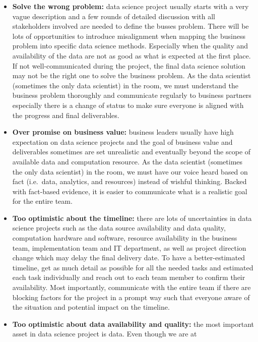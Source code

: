 \documentclass[
]{article}
\begin{document}
\begin{itemize}
\item
  \textbf{Solve the wrong problem:} data science project usually starts
  with a very vague description and a few rounds of detailed discussion
  with all stakeholders involved are needed to define the busses
  problem. There will be lots of opportunities to introduce misalignment
  when mapping the business problem into specific data science methods.
  Especially when the quality and availability of the data are not as
  good as what is expected at the first place. If not well-communicated
  during the project, the final data science solution may not be the
  right one to solve the business problem. As the data scientist
  (sometimes the only data scientist) in the room, we must understand
  the business problem thoroughly and communicate regularly to business
  partners especially there is a change of status to make sure everyone
  is aligned with the progress and final deliverables.
\item
  \textbf{Over promise on business value:} business leaders usually have
  high expectation on data science projects and the goal of business
  value and deliverables sometimes are set unrealistic and eventually
  beyond the scope of available data and computation resource. As the
  data scientist (sometimes the only data scientist) in the room, we
  must have our voice heard based on fact (i.e.~data, analytics, and
  resources) instead of wishful thinking. Backed with fact-based
  evidence, it is easier to communicate what is a realistic goal for the
  entire team.
\item
  \textbf{Too optimistic about the timeline:} there are lots of
  uncertainties in data science projects such as the data source
  availability and data quality, computation hardware and software,
  resource availability in the business team, implementation team and IT
  department, as well as project direction change which may delay the
  final delivery date. To have a better-estimated timeline, get as much
  detail as possible for all the needed tasks and estimated each task
  individually and reach out to each team member to confirm their
  availability. Most importantly, communicate with the entire team if
  there are blocking factors for the project in a prompt way such that
  everyone aware of the situation and potential impact on the timeline.
\item
  \textbf{Too optimistic about data availability and quality:} the most
  important asset in data science project is data. Even though we are at

\end{itemize}
\end{document}
